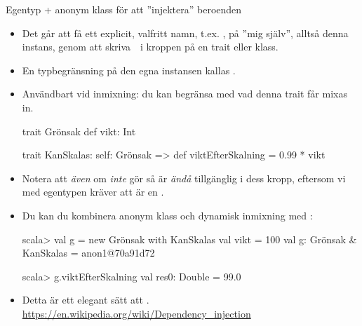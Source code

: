 \begin{Slide}{Egentyp + anonym klass för att ''injektera'' beroenden}\SlideFontSmall
\begin{itemize}\SlideFontTiny
  \item Det går att få ett explicit, valfritt namn, t.ex. ,  på ''mig själv'', alltså denna instans, genom att skriva~~i kroppen på en trait eller klass. 
  \item En typbegränsning på den egna instansen kallas  . 
  \item Användbart vid inmixning: du kan begränsa med vad denna trait får mixas in.
\begin{CodeSmall}
trait Grönsak { def vikt: Int }

trait KanSkalas:
  self: Grönsak =>
  def viktEfterSkalning = 0.99 * vikt 
\end{CodeSmall}
\item Notera att \emph{även} om  \emph{inte} gör  så är \emph{ändå}  tillgänglig i dess kropp, eftersom vi med egentypen kräver att  är en .
\pause
\item Du kan du kombinera anonym klass och dynamisk inmixning med :
\begin{REPLsmall}
scala> val g = new Grönsak with KanSkalas { val vikt = 100 }
val g: Grönsak & KanSkalas = anon1@70a91d72
                                                                                    
scala> g.viktEfterSkalning
val res0: Double = 99.0
\end{REPLsmall}
\item Detta är ett elegant sätt att  .\\\url{https://en.wikipedia.org/wiki/Dependency_injection}
\end{itemize}
\end{Slide}

